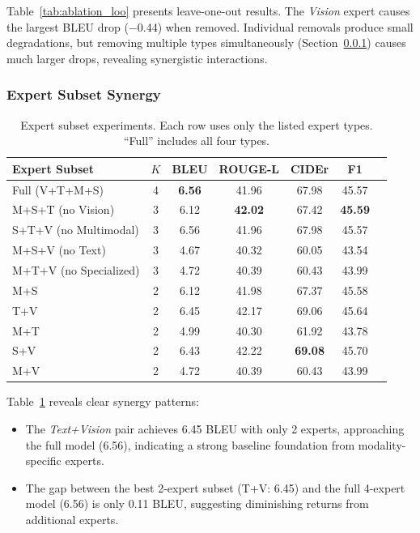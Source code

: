 Table~\ref{tab:ablation_loo} presents leave-one-out results. The \textit{Vision} expert causes the largest BLEU drop ($-$0.44) when removed. Individual removals produce small degradations, but removing multiple types simultaneously (Section~\ref{sec:experiments:ablation:subset}) causes much larger drops, revealing synergistic interactions.

\subsubsection{Expert Subset Synergy}
\label{sec:experiments:ablation:subset}

\begin{table}[t]
\centering
\caption{Expert subset experiments. Each row uses only the listed expert types. ``Full'' includes all four types.}
\label{tab:ablation_subset}
\begin{tabular}{lcccccc}
\toprule
Expert Subset & $K$ & BLEU & ROUGE-L & CIDEr & F1 \\
\midrule
Full (V+T+M+S)     & 4 & \textbf{6.56} & 41.96 & 67.98 & 45.57 \\
\midrule
M+S+T (no Vision)  & 3 & 6.12 & \textbf{42.02} & 67.42 & \textbf{45.59} \\
S+T+V (no Multimodal) & 3 & 6.56 & 41.96 & 67.98 & 45.57 \\
M+S+V (no Text)    & 3 & 4.67 & 40.32 & 60.05 & 43.54 \\
M+T+V (no Specialized) & 3 & 4.72 & 40.39 & 60.43 & 43.99 \\
\midrule
M+S                & 2 & 6.12 & 41.98 & 67.37 & 45.58 \\
T+V                & 2 & 6.45 & 42.17 & 69.06 & 45.64 \\
M+T                & 2 & 4.99 & 40.30 & 61.92 & 43.78 \\
S+V                & 2 & 6.43 & 42.22 & \textbf{69.08} & 45.70 \\
M+V                & 2 & 4.72 & 40.39 & 60.43 & 43.99 \\
\bottomrule
\end{tabular}
\end{table}

Table~\ref{tab:ablation_subset} reveals clear synergy patterns:

\begin{itemize}
    \item The \textit{Text+Vision} pair achieves 6.45 BLEU with only 2 experts, approaching the full model (6.56), indicating a strong baseline foundation from modality-specific experts.
    \item The gap between the best 2-expert subset (T+V: 6.45) and the full 4-expert model (6.56) is only 0.11 BLEU, suggesting diminishing returns from additional experts.
\end{itemize}

